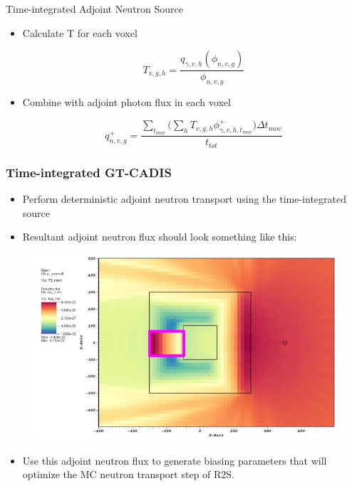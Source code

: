 \documentclass{beamer}
\begin{document}
\begin{frame}{Time-integrated Adjoint Neutron Source}
	\begin{itemize}
          \item{Calculate T for each voxel}

	    \begin{equation}\label{eq:T}
	  	T_{v,g,h} = \dfrac{q_{\gamma,v,h}(\phi_{n,v,g})}{\phi_{n,v,g}}
	    \end{equation}

	  \item{Combine with adjoint photon flux in each voxel}

	    \begin{equation}\label{eq:tgt_n_src}
	    	q_{n,v,g}^{+} = \frac
	    	{\sum_{t_{mov}}\big(\sum_{h} T_{v,g,h}
	    	\phi_{\gamma,v,h,t_{mov}}^{+}\big) \Delta t_{mov}}
	    	{t_{tot}}
	    \end{equation}
	\end{itemize}
\end{frame}

\begin{frame}
	\frametitle{Time-integrated GT-CADIS}
	\begin{itemize}
		\item{Perform deterministic adjoint neutron transport using the
			time-integrated source}
		\item{Resultant adjoint neutron flux should look something like
			this:}
	\end{itemize}
        \begin{figure}
	\centering
	\includegraphics[scale=0.20]{tgt_adj_n.jpg}
	\end{figure}
	\begin{itemize}
		\item{Use this adjoint neutron flux to generate biasing
			parameters that will optimize the MC neutron transport
			step of R2S.}
	\end{itemize}
\end{frame}
\end{document}
